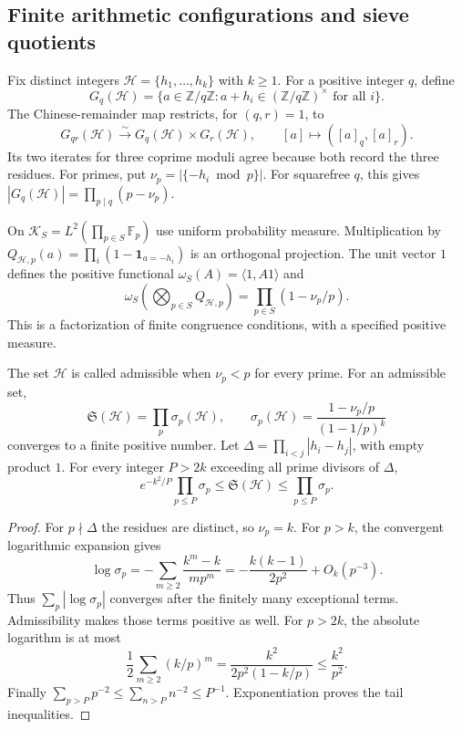\subsection{Finite arithmetic configurations and sieve quotients}
\label{syn-arith:configurations}

Fix distinct integers $\mathcal H=\{h_1,\ldots,h_k\}$ with $k\geq1$.
For a positive integer $q$, define
\[
 G_q(\mathcal H)=\{a\in\mathbb Z/q\mathbb Z:
                         a+h_i\in(\mathbb Z/q\mathbb Z)^\times\text{ for all }i\}.
\]
The Chinese-remainder map restricts, for $(q,r)=1$, to
\[
 G_{qr}(\mathcal H)\xrightarrow{\sim}G_q(\mathcal H)\times G_r(\mathcal H),
 \qquad [a]\longmapsto([a]_q,[a]_r).
\]
Its two iterates for three coprime moduli agree because both record the three residues.
For primes, put $\nu_p=|\{-h_i\bmod p\}|$.
For squarefree $q$, this gives $|G_q(\mathcal H)|=\prod_{p\mid q}(p-\nu_p)$.

On $\mathscr K_S=L^2(\prod_{p\in S}\mathbb F_p)$ use uniform probability measure.
Multiplication by
$Q_{\mathcal H,p}(a)=\prod_i(1-\mathbf1_{a=-h_i})$
is an orthogonal projection.
The unit vector $1$ defines the positive functional
$\omega_S(A)=\langle1,A1\rangle$ and
\[
 \omega_S\left(\bigotimes_{p\in S}Q_{\mathcal H,p}\right)
 =\prod_{p\in S}(1-\nu_p/p).
\]
This is a factorization of finite congruence conditions, with a specified positive measure.

\begin{theorem}
\label{syn-arith:singular-series}
The set $\mathcal H$ is called admissible when $\nu_p<p$ for every prime.
For an admissible set,
\[
 \mathfrak S(\mathcal H)=\prod_p\sigma_p(\mathcal H),\qquad
 \sigma_p(\mathcal H)=\frac{1-\nu_p/p}{(1-1/p)^k}
\]
converges to a finite positive number.
Let $\Delta=\prod_{i<j}|h_i-h_j|$, with empty product $1$.
For every integer $P>2k$ exceeding all prime divisors of $\Delta$,
\[
 e^{-k^2/P}\prod_{p\leq P}\sigma_p
 \leq\mathfrak S(\mathcal H)\leq\prod_{p\leq P}\sigma_p.
\]
\end{theorem}
\begin{proof}
For $p\nmid\Delta$ the residues are distinct, so $\nu_p=k$.
For $p>k$, the convergent logarithmic expansion gives
\[
 \log\sigma_p=-\sum_{m\geq2}\frac{k^m-k}{mp^m}
             =-\frac{k(k-1)}{2p^2}+O_k(p^{-3}).
\]
Thus $\sum_p|\log\sigma_p|$ converges after the finitely many exceptional terms.
Admissibility makes those terms positive as well.
For $p>2k$, the absolute logarithm is at most
\[
 \frac12\sum_{m\geq2}(k/p)^m
 =\frac{k^2}{2p^2(1-k/p)}\leq\frac{k^2}{p^2}.
\]
Finally $\sum_{p>P}p^{-2}\leq\sum_{n>P}n^{-2}\leq P^{-1}$.
Exponentiation proves the tail inequalities.
\end{proof}

